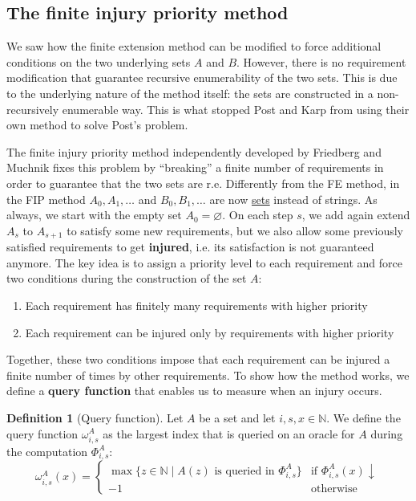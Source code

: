 \documentclass[12pt,a4paper]{article}
\theoremstyle{definition}
\newtheorem{definition}{Definition}
\newcommand{\curlyquotes}[1]{\textquotedblleft #1\textquotedblright}
\newcommand{\N}{\mathbb{N}}                     %
\begin{document}
    \subsection{The finite injury priority method}

    We saw how the finite extension method can be modified to force additional conditions on the two underlying sets $A$ and $B$. However, there is no requirement modification that guarantee recursive enumerability of the two sets. This is due to the underlying nature of the method itself: the sets are constructed in a non-recursively enumerable way. This is what stopped Post and Karp from using their own method to solve Post's problem.
    
    The finite injury priority method independently developed by Friedberg and Muchnik fixes this problem by \curlyquotes{breaking} a finite number of requirements in order to guarantee that the two sets are r.e. Differently from the FE method, in the FIP method $A_0, A_1, \ldots$ and $B_0, B_1, \ldots$ are now \underline{sets} instead of strings. As always, we start with the empty set $A_0 = \varnothing$. On each step $s$, we add again extend $A_s$ to $A_{s+1}$ to satisfy some new requirements, but we also allow some previously satisfied requirements to get \textbf{injured}, i.e. its satisfaction is not guaranteed anymore. The key idea is to assign a priority level to each requirement and force two conditions during the construction of the set $A$:
    \begin{enumerate}
        \item Each requirement has finitely many requirements with higher priority
        \item Each requirement can be injured only by requirements with higher priority 
    \end{enumerate}

    Together, these two conditions impose that each requirement can be injured a finite number of times by other requirements. To show how the method works, we define a \textbf{query function} that enables us to measure when an injury occurs. 

    \begin{definition}[Query function]
        Let $A$ be a set and let $i,s,x \in \N$. We define the query function $\omega_{i,s}^A$ as the largest index that is queried on an oracle for $A$ during the computation $\Phi_{i,s}^A$:
        \[\omega_{i,s}^A(x) = \left \{ \begin{array}{ll}
            \max \{z \in \N \mid A(z) \text{ is queried in } \Phi_{i,s}^A\} & \text{if } \Phi_{i,s}^A(x) \downarrow \\
            -1 & \text{otherwise}
        \end{array}\right .\]
    \end{definition}
\end{document}
